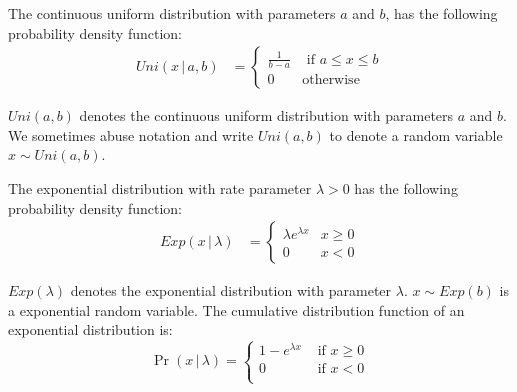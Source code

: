 \begin{definition}
    \label{def:UniformDistribution}
    The continuous uniform distribution with parameters $a$ and $b$, has the following probability density function:
    \begin{equation}
        \begin{split}
            Uni\left(x \,|\,a,b\right)
            &=
            \begin{cases}
                \frac{1}{b-a} & \text{ if } a\leq x\leq b \\
                0             & \text{otherwise}
            \end{cases}
        \end{split}
    \end{equation}
\end{definition}
$Uni\left(a,b\right)$ denotes the continuous uniform distribution with parameters $a$ and $b$. We sometimes abuse notation and write $Uni\left( a,b\right)$ to denote a random variable $x \sim Uni\left( a,b\right)$.


\begin{definition}
    \label{def:ExponentialDistribution}
    The exponential distribution with rate parameter $\lambda>0$ has the following probability density function:
    \begin{equation}
        \begin{split}
            Exp\left(x \,|\,\lambda\right)            &=
            \begin{cases}
                \lambda e^{\lambda x } & x\geq 0 \\
                0                      & x <0
            \end{cases}
        \end{split}
    \end{equation}
\end{definition}
$Exp\left(\lambda\right)$ denotes the exponential distribution with parameter $\lambda$.
$x \sim Exp\left( b\right)$ is a exponential random variable. The cumulative distribution function of an exponential distribution is:
\begin{equation}
    \Pr\left( x\,|\,\lambda\right)=
    \begin{cases}
        1- e^{\lambda x} & \text{ if } x \geq 0 \\
        0                & \text{ if } x < 0    \\
    \end{cases}
\end{equation}


